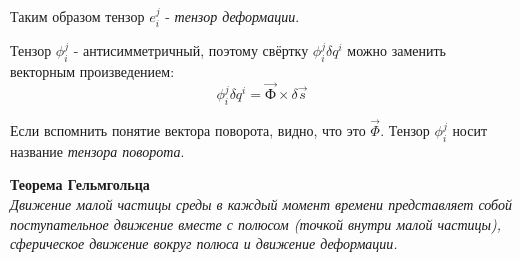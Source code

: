 Таким образом тензор \( e^j_{i} \) - \textit{тензор деформации}.

Тензор \( \phi^j_{i} \) - антисимметричный, поэтому свёртку
\( \phi^j_{i}\delta q^i \) можно заменить векторным произведением:
\[
    \phi^j_{i}\delta q^i = \vec{\text{Ф}} \times \delta\vec{s}
\]
    
Если вспомнить понятие вектора поворота, видно, что это \( \vec{\Phi} \).
Тензор \( \phi^j_{i} \) носит название \emph{тензора поворота}.

\textbf{Теорема Гельмгольца}\\
\textit{Движение малой частицы среды в каждый момент времени представляет
собой поступательное движение вместе с полюсом (точкой внутри малой частицы),
сферическое движение вокруг полюса и движение деформации.}

\newpage
